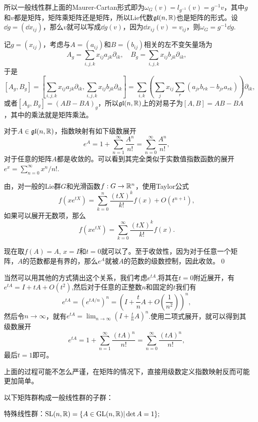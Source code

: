 \documentclass[9pt]{extarticle}
\begin{document}
所以一般线性群上面的Maurer-Cartan形式即为$\omega_G(v)=l_{g^{-1}}(v)=g^{-1}v$，其中$g$和$v$都是矩阵，矩阵乘矩阵还是矩阵，所以Lie代数$\mathfrak{gl}(n,\mathbb{R})$也是矩阵的形式。设$\dd g=(\dd x_{ij})$，那么$v$就可以写成$\dd g(v)$，因为$\dd x_{ij}(v)=v_{ij}$，则$\omega_G=g^{-1}\dd g$.


记$g=(x_{ij})$，考虑与$A=(a_{ij})$和$B=(b_{ij})$相关的左不变矢量场为
\[
A_g=\sum_{i,j,k}x_{ij}a_{jk}\partial_{ik},\quad B_g=\sum_{i,j,k}x_{ij}b_{jk}\partial_{ik},
\]
于是
\[
[A_g,B_g]=\left[\sum_{i,j,k}x_{ij}a_{jk}\partial_{ik},\sum_{i,j,k}x_{ij}b_{jk}\partial_{ik}\right]=\sum_{i,k}\left(\sum_{j}x_{ij}\sum_{r}(a_{jr}b_{rk}-b_{jr}a_{rk})\right)\partial_{ik},
\]
或者$[A_g,B_g]=(AB-BA)_g$，所以$\mathfrak{gl}(n,\mathbb{R})$上的对易子为$[A,B]=AB-BA$，其中的乘法就是矩阵乘法。

\para 对于$A\in\mathfrak{gl}(n,\mathbb{R})$，指数映射有如下级数展开
\[
	e^A=1+\sum_{n=1}^\infty \frac{A^n}{n!}=\sum_{n=0}^\infty \frac{A^n}{n!},
\]
对于任意的矩阵$A$都是收敛的。可以看到其完全类似于实数值指数函数的展开$e^x=\sum_{n=0}^\infty x^n/n!$.

\proof 由，对一般的Lie群$G$和光滑函数$f:G\to \mathbb{R}^n$，使用Taylor公式
\[
	f(xe^{tX})=\sum_{k=0}^n\frac{(tX)^{k}}{k!}f(x)+O(t^{n+1}),
\]
如果可以展开无数项，那么
\[
	f(xe^{tX})=\sum_{k=0}^\infty\frac{(tX)^{k}}{k!}f(x).
\]

现在取$f(A)=A$, $x=I$和$t=0$就可以了。至于收敛性，因为对于任意一个矩阵，$A$的范数都是有界的，那么$e^A$就被$A$的范数的级数控制，因此收敛。\qed

当然可以用其他的方式猜出这个关系，我们考虑$e^{tA}$,将其在$t=0$附近展开，有$e^{tA}=I+tA+O(t^2)$,然后对于任意的正整数$n$和固定的$t$我们有
\[
	e^{tA}=\left(e^{tA/n}\right)^n=\left(I+\frac{t}{n}A+O\left(\frac{1}{n^2}\right)\right)^n,
\]
然后令$n\to\infty$，就有$e^{tA}=\lim_{n\to\infty}\left(I+\frac{t}{n}A\right)^n$.使用二项式展开，就可以得到其级数展开
\[
	e^{tA}=1+\sum_{n=1}^\infty \frac{(tA)^n}{n!}=\sum_{n=0}^\infty \frac{(tA)^n}{n!},
\]
最后$t=1$即可。

上面的过程可能不怎么严谨，在矩阵的情况下，直接用级数定义指数映射反而可能更加简单。

\para 以下矩阵群构成一般线性群的子群：

 特殊线性群：$\mathrm{SL}(n,\mathbb{R})=\{A\in \mathrm{GL}(n,\mathbb{R})|\det A=1\};$
\end{document}
